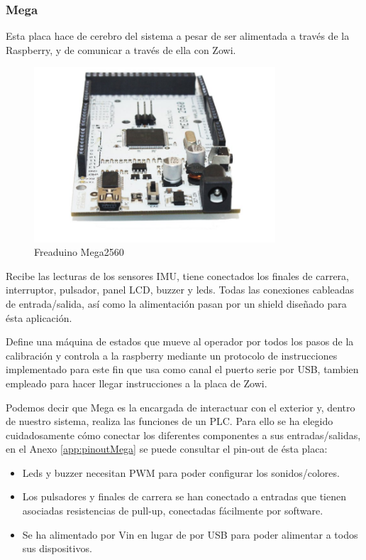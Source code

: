 \subsubsection{Mega}
Esta placa hace de cerebro del sistema a pesar de ser alimentada a través de la Raspberry, y de comunicar a través de ella con Zowi.

\begin{figure}
\centering
\includegraphics[width=90mm]{Figures/arduinoMega}
\caption{Freaduino Mega2560}
\label{fig:arduinoMega}
\end{figure}

Recibe las lecturas de los sensores IMU, tiene conectados los finales de carrera, interruptor, pulsador, panel LCD, buzzer y leds. Todas las conexiones cableadas de entrada/salida, así como la alimentación pasan por un shield diseñado para ésta aplicación.

Define una máquina de estados que mueve al operador por todos los pasos de la calibración y controla a la raspberry mediante un protocolo de instrucciones implementado para este fin que usa como canal el puerto serie por USB, tambien empleado para hacer llegar instrucciones a la placa de Zowi.

Podemos decir que Mega es la encargada de interactuar con el exterior y, dentro de nuestro sistema, realiza las funciones de un PLC. Para ello se ha elegido cuidadosamente cómo conectar los diferentes componentes a sus entradas/salidas, en el Anexo \ref{app:pinoutMega} se puede consultar el pin-out de ésta placa:
\begin{itemize}
  \item Leds y buzzer necesitan PWM para poder configurar los sonidos/colores.
  \item Los pulsadores y finales de carrera se han conectado a entradas que tienen asociadas resistencias de pull-up, conectadas fácilmente por software.
  \item Se ha alimentado por Vin en lugar de por USB para poder alimentar a todos sus dispositivos.
\end{itemize}

